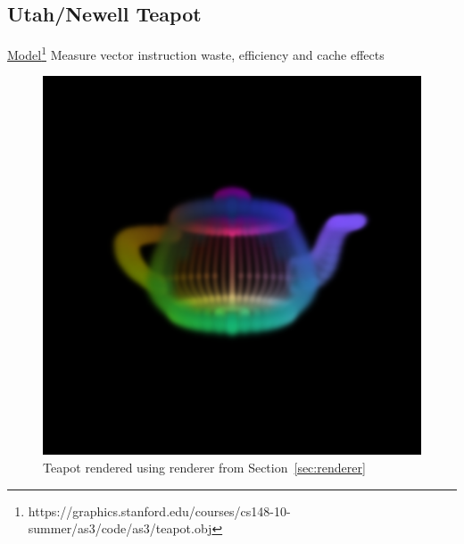 \documentclass[a4paper, 11pt]{memoir}
\begin{document}
    \subsection{Utah/Newell Teapot}
    \href{https://graphics.stanford.edu/courses/cs148-10-summer/as3/code/as3/teapot.obj}{Model}\footnote{https://graphics.stanford.edu/courses/cs148-10-summer/as3/code/as3/teapot.obj}
    Measure vector instruction waste, efficiency and cache effects

    \begin{figure}[H]
        \centering
        \includegraphics[scale=.2]{images/teapot.png}
        \caption{Teapot rendered using renderer from Section~\ref{sec:renderer}}
        \label{fig:teapot_render}
    \end{figure}
\end{document}
